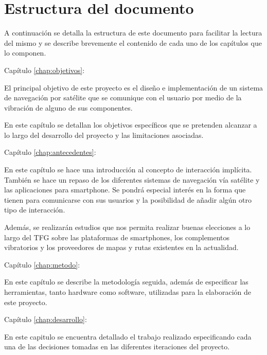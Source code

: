 \section{Estructura del documento}

A continuación se detalla la estructura de este documento para facilitar la lectura del mismo y
se describe brevemente el contenido de cada uno de los capítulos que lo componen.

\begin{definitionlist}
  \item[Capítulo \ref{chap:objetivos}: \nameref{chap:objetivos}] 

  El principal objetivo de este proyecto es el diseño e implementación de un sistema de navegación
  por satélite que se comunique con el usuario por medio de la vibración de alguno de sus
  componentes.

  En este capítulo se detallan los objetivos específicos que se pretenden alcanzar a lo largo del
  desarrollo del proyecto y las limitaciones asociadas.

  \item[Capítulo \ref{chap:antecedentes}: \nameref{chap:antecedentes}]

  En este capítulo se hace una introducción al concepto de interacción implícita. También se hace un
  repaso de los diferentes sistemas de navegación vía satélite y las aplicaciones para
  smartphone. Se pondrá especial interés en la forma que tienen para comunicarse con sus usuarios y
  la posibilidad de añadir algún otro tipo de interacción.

  Además, se realizarán estudios que nos permita realizar buenas elecciones a lo largo del \acs{TFG}
  sobre las plataformas de smartphones, los complementos vibratorios y los proveedores de mapas y
  rutas existentes en la actualidad.

  \item[Capítulo \ref{chap:metodo}: \nameref{chap:metodo}]

  En este capítulo se describe la metodología seguida, además de especificar las herramientas,
  tanto hardware como software, utilizadas para la elaboración de este proyecto.

  \item[Capítulo \ref{chap:desarrollo}: \nameref{chap:desarrollo}]

  En este capitulo se encuentra detallado el trabajo realizado especificando cada una de las
  decisiones tomadas en las diferentes iteraciones del proyecto.


\end{definitionlist}
